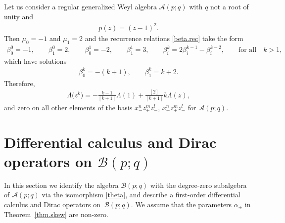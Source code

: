 \documentclass[pdftex]{sigma}
\numberwithin{equation}{section}
\def\Weyl#1#2{{\mathcal{B}}(#1;#2)}
\def\AWeyl#1#2{{\mathcal{A}}(#1;#2)}
\begin{document}
\begin{Example}\label{ex.lambda.2}
Let us consider a regular generalized Weyl algebra $\AWeyl p q$ with $q$ not a root of unity and
\begin{gather*}
p(z) = (z -1)^2.
\end{gather*}
Then $\mu_0 = -1$ and $\mu_1 = 2$ and the recurrence relations \eqref{beta.rec} take the form
\begin{gather*}
\beta^0_0 = -1, \!\qquad \beta^0_1 = 2 , \!\qquad \beta^1_0 = -2, \!\qquad \beta^1_1 = 3, \!\qquad \beta^k_i = 2\beta^{k-1}_i - \beta^{k-2}_i, \!\qquad \mbox{for all}
\quad k>1,
\end{gather*}
which have solutions
\begin{gather*}
\beta^k_0 = -(k+1), \qquad \beta^k_1 = k+2.
\end{gather*}
Therefore,
\begin{gather*}
\Lambda \big(z^k\big) = -\frac{k-1}{[k +1]} \Lambda (1)+ \frac{[2] }{[k +1]}k \Lambda (z),
\end{gather*}
and zero on all other elements of the basis $x_-^nz_+^mz_-^l$, $x_+^nz_+^mz_-^l$ for $\AWeyl p q$.
\end{Example}

\section[Dif\/ferential calculus and Dirac operators on ${\mathcal B}(p;q)$]{Dif\/ferential calculus and Dirac operators on $\Weyl p q$}\label{sec.diff.b}
In this section we identify the algebra $\Weyl p q$ with the degree-zero subalgebra of $\AWeyl p q$ via the isomorphism \eqref{theta}, and describe a f\/irst-order dif\/ferential calculus and Dirac operators on~$\Weyl p q$. We assume that the parameters $\alpha_\pm$ in Theorem~\ref{thm.skew} are non-zero.
\end{document}
